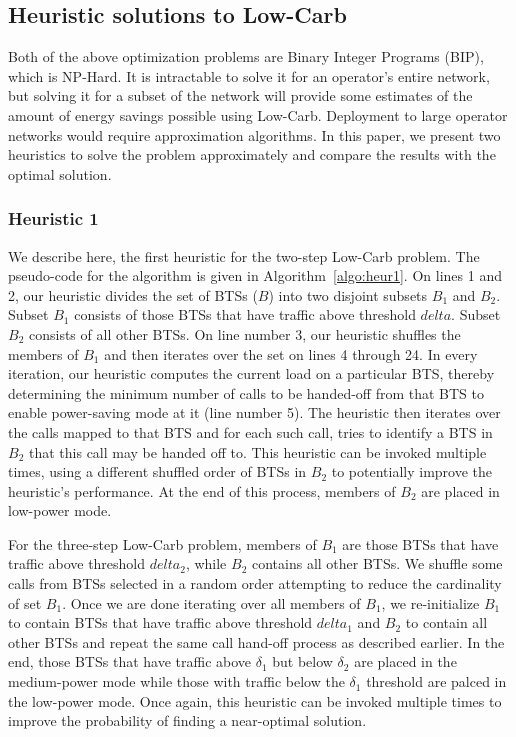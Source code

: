 \subsection{Heuristic solutions to Low-Carb}
\label{subsec:heuristics} Both of the above optimization problems are Binary Integer Programs
(BIP), which is NP-Hard. It is intractable to solve it for an
operator's entire network, but solving it for a subset of the
network will provide some estimates of the amount of energy
savings possible using Low-Carb. Deployment to large operator
networks would require approximation algorithms. In this paper, we present two heuristics to solve the problem approximately and compare the results with the optimal solution.

\subsubsection{Heuristic 1}
\label{subsubsec:heuristic1} We describe here, the first heuristic for the two-step Low-Carb problem. The pseudo-code for the algorithm is given in Algorithm~\ref{algo:heur1}. On lines 1 and 2, our heuristic divides the set of BTSs ($B$) into two disjoint subsets $B_1$ and $B_2$. Subset $B_1$ consists of those BTSs that have traffic above threshold $delta$. Subset $B_2$ consists of all other BTSs. On line number 3, our heuristic shuffles the members of $B_1$ and then iterates over the set on lines 4 through 24. In every iteration, our heuristic computes the current load on a particular BTS, thereby determining the minimum number of calls to be handed-off from that BTS to enable power-saving mode at it (line number 5). The heuristic then iterates over the calls mapped to that BTS and for each such call, tries to identify a BTS in $B_2$ that this call may be handed off to. This heuristic can be invoked multiple times, using a different shuffled order of BTSs in $B_2$ to potentially improve the heuristic's performance. At the end of this process, members of $B_2$ are placed in low-power mode. 


For the three-step Low-Carb problem, members of $B_1$ are those BTSs that have traffic above threshold $delta_2$, while $B_2$ contains all other BTSs. We shuffle some calls from BTSs selected in a random order attempting to reduce the cardinality of set $B_1$. Once we are done iterating over all members of $B_1$, we re-initialize $B_1$ to contain BTSs that have traffic above threshold $delta_1$ and $B_2$ to contain all other BTSs and repeat the same call hand-off process as described earlier. In the end, those BTSs that have traffic above $\delta_1$ but below $\delta_2$ are placed in the medium-power mode while those with traffic below the $\delta_1$ threshold are palced in the low-power mode. Once again, this heuristic can be invoked multiple times to improve the probability of finding a near-optimal solution.

